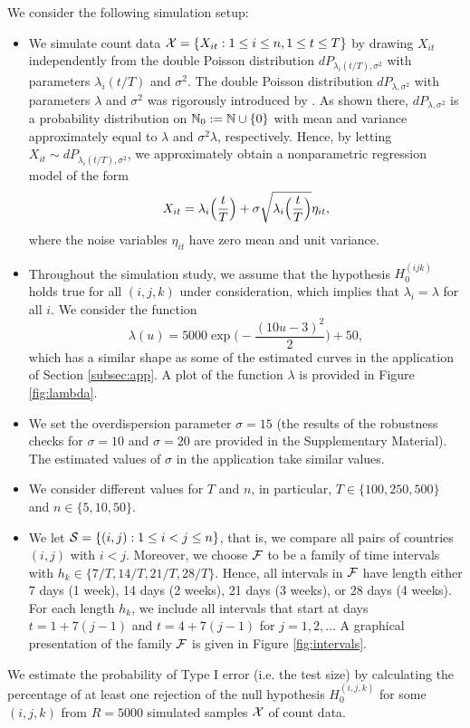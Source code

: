 \documentclass[a4paper,12pt]{article}
\numberwithin{equation}{section}
\begin{document}
We consider the following simulation setup: 
\begin{itemize}[leftmargin=0.45cm]

\item We simulate count data $\mathcal{X} = \{ X_{it}: 1 \le i \le n, 1 \le t \le T \}$ by drawing $X_{it}$ independently from the double Poisson distribution $dP_{\lambda_i(t/T),\sigma^2}$ with parameters $\lambda_i(t/T)$ and $\sigma^2$. The double Poisson distribution $dP_{\lambda,\sigma^2}$ with parameters $\lambda$ and $\sigma^2$ was rigorously introduced by \cite{Efron1986}. As shown there, $dP_{\lambda,\sigma^2}$ is a probability distribution on $\mathbb{N}_0 := \mathbb{N} \cup \{ 0 \}$ with mean and variance approximately equal to $\lambda$ and $\sigma^2 \lambda$, respectively. Hence, by letting $X_{it} \sim dP_{\lambda_i(t/T),\sigma^2}$, we approximately obtain a nonparametric regression model of the form 
\[ X_{it} = \lambda_i\Big(\frac{t}{T}\Big) + \sigma \sqrt{\lambda_i\Big(\frac{t}{T}\Big)} \eta_{it}, \]
where the noise variables $\eta_{it}$ have zero mean and unit variance.

\item Throughout the simulation study, we assume that the hypothesis $H_0^{(ijk)}$ holds true for all $(i,j,k)$ under consideration, which implies that $\lambda_i = \lambda$ for all $i$. We consider the function 
\[ \lambda(u) = 5000 \exp\Big(-\frac{(10 u-3)^2}{2}\Big) + 50, \]
which has a similar shape as some of the estimated curves in the application of Section \ref{subsec:app}. A plot of the function $\lambda$ is provided in Figure \ref{fig:lambda}. 

\item We set the overdispersion parameter $\sigma = 15$ (the results of the robustness checks for $\sigma=10$ and $\sigma=20$ are provided in the Supplementary Material). The estimated values of $\sigma$ in the application take similar values.

\item We consider different values for $T$ and $n$, in particular, $T \in \{100,250, 500\}$ and $n \in \{5,10,50\}$. 

\item We let $\mathcal{S} = \{ (i,j): 1 \le i < j \le n\}$, that is, we compare all pairs of countries $(i,j)$ with $i < j$. Moreover, we choose $\mathcal{F}$ to be a family of time intervals with $h_k \in \{ 7/T,14/T,21/T,28/T \}$. Hence, all intervals in $\mathcal{F}$ have length either 7 days (1 week), 14 days (2 weeks), 21 days (3 weeks), or 28 days (4 weeks). For each length $h_k$, we include all intervals that start at days $t = 1 + 7(j-1)$ and $t = 4 + 7(j-1)$ for $j=1,2,\ldots$ A graphical presentation of the family $\mathcal{F}$ is given in Figure \ref{fig:intervals}. 

\end{itemize}
We estimate the probability of Type I error (i.e. the test size) by calculating the percentage of at least one rejection of the null hypothesis $H_0^{(i, j, k)}$ for some $(i, j, k)$ from $R=5 000$ simulated samples $\mathcal{X}$ of count data.
\end{document}
